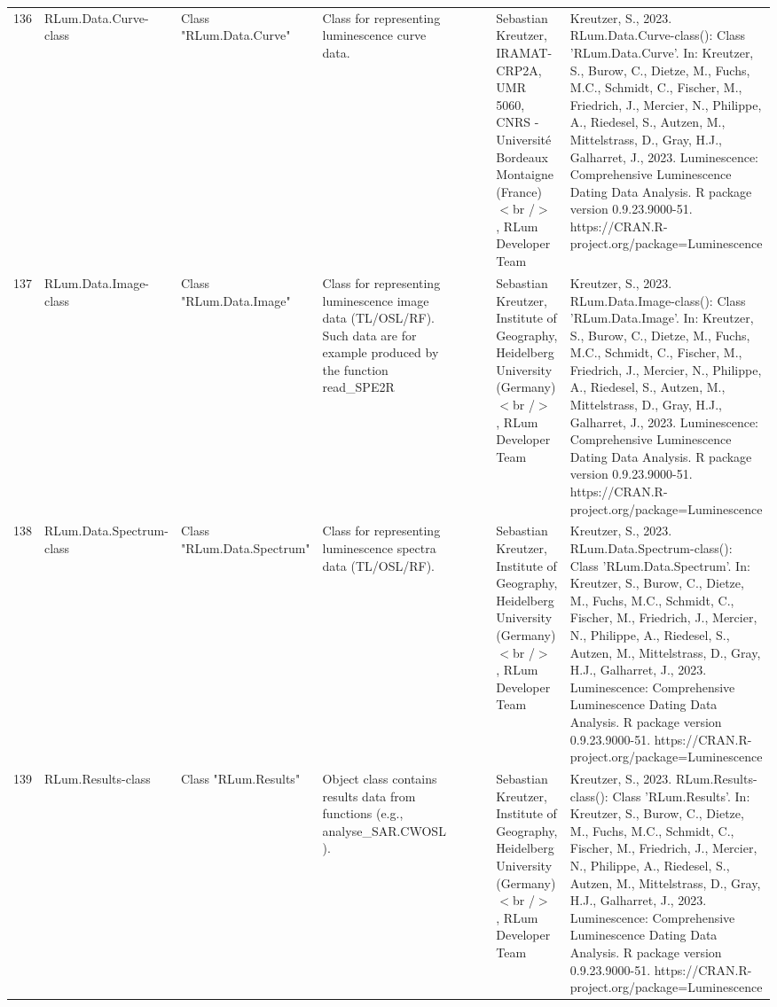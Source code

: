 \begin{table}[ht]
\begin{tabular}{rllllllll}
  136 & RLum.Data.Curve-class & Class  "RLum.Data.Curve" & Class for representing luminescence curve data. &  &  &  & Sebastian Kreutzer, IRAMAT-CRP2A, UMR 5060, CNRS - Université Bordeaux Montaigne (France)$<$br /$>$ , RLum Developer Team & Kreutzer, S., 2023. RLum.Data.Curve-class(): Class 'RLum.Data.Curve'. In: Kreutzer, S., Burow, C., Dietze, M., Fuchs, M.C., Schmidt, C., Fischer, M., Friedrich, J., Mercier, N., Philippe, A., Riedesel, S., Autzen, M., Mittelstrass, D., Gray, H.J., Galharret, J., 2023. Luminescence: Comprehensive Luminescence Dating Data Analysis. R package version 0.9.23.9000-51. https://CRAN.R-project.org/package=Luminescence
 \\ 
  137 & RLum.Data.Image-class & Class  "RLum.Data.Image" & Class for representing luminescence image data (TL/OSL/RF). Such data are for example produced by the function  read\_SPE2R &  &  &  & Sebastian Kreutzer, Institute of Geography, Heidelberg University (Germany)$<$br /$>$ , RLum Developer Team & Kreutzer, S., 2023. RLum.Data.Image-class(): Class 'RLum.Data.Image'. In: Kreutzer, S., Burow, C., Dietze, M., Fuchs, M.C., Schmidt, C., Fischer, M., Friedrich, J., Mercier, N., Philippe, A., Riedesel, S., Autzen, M., Mittelstrass, D., Gray, H.J., Galharret, J., 2023. Luminescence: Comprehensive Luminescence Dating Data Analysis. R package version 0.9.23.9000-51. https://CRAN.R-project.org/package=Luminescence
 \\ 
  138 & RLum.Data.Spectrum-class & Class  "RLum.Data.Spectrum" & Class for representing luminescence spectra data (TL/OSL/RF). &  &  &  & Sebastian Kreutzer, Institute of Geography, Heidelberg University (Germany)$<$br /$>$ , RLum Developer Team & Kreutzer, S., 2023. RLum.Data.Spectrum-class(): Class 'RLum.Data.Spectrum'. In: Kreutzer, S., Burow, C., Dietze, M., Fuchs, M.C., Schmidt, C., Fischer, M., Friedrich, J., Mercier, N., Philippe, A., Riedesel, S., Autzen, M., Mittelstrass, D., Gray, H.J., Galharret, J., 2023. Luminescence: Comprehensive Luminescence Dating Data Analysis. R package version 0.9.23.9000-51. https://CRAN.R-project.org/package=Luminescence
 \\ 
  139 & RLum.Results-class & Class  "RLum.Results" & Object class contains results data from functions (e.g.,  analyse\_SAR.CWOSL ). &  &  &  & Sebastian Kreutzer, Institute of Geography, Heidelberg University (Germany)$<$br /$>$ , RLum Developer Team & Kreutzer, S., 2023. RLum.Results-class(): Class 'RLum.Results'. In: Kreutzer, S., Burow, C., Dietze, M., Fuchs, M.C., Schmidt, C., Fischer, M., Friedrich, J., Mercier, N., Philippe, A., Riedesel, S., Autzen, M., Mittelstrass, D., Gray, H.J., Galharret, J., 2023. Luminescence: Comprehensive Luminescence Dating Data Analysis. R package version 0.9.23.9000-51. https://CRAN.R-project.org/package=Luminescence

\end{tabular}
\end{table}
